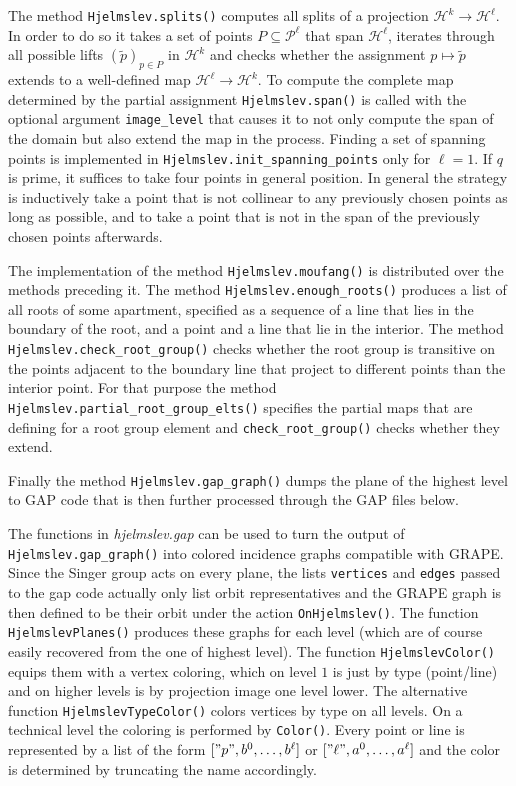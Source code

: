 \documentclass[a4paper,11pt]{amsart}
\numberwithin{equation}{section}
\theoremstyle{plain}
\theoremstyle{definition}
\theoremstyle{remark}
\newcommand{\hjelm}{\mathcal{H}}
\newcommand{\hpts}{\mathcal{P}}
\numberwithin{equation}{section}
\begin{document}
The method \verb|Hjelmslev.splits()| computes all splits of a projection $\hjelm^k \to \hjelm^\ell$. In order to do so it takes a set of points $P \subseteq \hpts^\ell$ that span $\hjelm^\ell$, iterates through all possible lifts $(\tilde{p})_{p \in P}$ in $\hjelm^k$ and checks whether the assignment $p \mapsto \tilde{p}$ extends to a well-defined map $\hjelm^\ell \to \hjelm^k$. 
To compute the complete map determined by the partial assignment \verb|Hjelmslev.span()| is called with the optional argument \verb|image_level| that causes it to not only compute the span of the domain but also extend the map in the process. Finding a set of spanning points is implemented in \verb|Hjelmslev.init_spanning_points| only for $\ell = 1$. If $q$ is prime, it suffices to take four points in general position. In general the strategy is inductively take a point that is not collinear to any previously chosen points as long as possible, and to take a point that is not in the span of the previously chosen points afterwards.

The implementation of the method \verb|Hjelmslev.moufang()| is distributed over the methods preceding it. The method \verb|Hjelmslev.enough_roots()| produces a list of all roots of some apartment, specified as a sequence of a line that lies in the boundary of the root, and a point and a line that lie in the interior. The method \verb|Hjelmslev.check_root_group()| checks whether the root group is transitive on the points adjacent to the boundary line that project to different points than the interior point. For that purpose the method \verb|Hjelmslev.partial_root_group_elts()| specifies the partial maps that are defining for a root group element and \verb|check_root_group()| checks whether they extend.

Finally the method \verb|Hjelmslev.gap_graph()| dumps the plane of the highest level to GAP code that is then further processed through the GAP files below.



The functions in \emph{hjelmslev.gap} can be used to turn the output of \verb|Hjelmslev.gap_graph()| into colored incidence graphs compatible with GRAPE. Since the Singer group acts on every plane, the lists \verb|vertices| and \verb|edges| passed to the gap code actually only list orbit representatives and the GRAPE graph is then defined to be their orbit under the action \verb|OnHjelmslev()|. The function \verb|HjelmslevPlanes()| produces these graphs for each level (which are of course easily recovered from the one of highest level). The function \verb|HjelmslevColor()| equips them with a vertex coloring, which on level $1$ is just by type (point/line) and on higher levels is by projection image one level lower. The alternative function \verb|HjelmslevTypeColor()| colors vertices by type on all levels. On a technical level the coloring is performed by \verb|Color()|. Every point or line is represented by a list of the form $["p", b^0, \ldots, b^\ell]$ or $["\ell", a^0, \ldots, a^\ell]$ and the color is determined by truncating the name accordingly.
\end{document}
